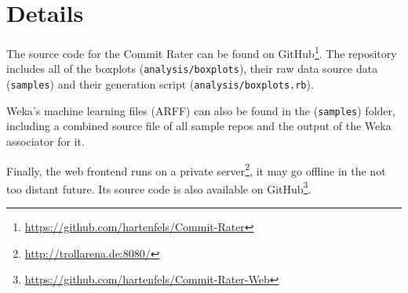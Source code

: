 \section{Details}
\label{sec:details}

The source code for the Commit Rater can be found on GitHub\footnote{\url{https://github.com/hartenfels/Commit-Rater}}. The repository includes all of the boxplots (\texttt{analysis/boxplots}), their raw data source data (\texttt{samples}) and their generation script (\texttt{analysis/boxplots.rb}).

Weka's machine learning files (ARFF) can also be found in the (\texttt{samples}) folder, including a combined source file of all sample repos and the output of the Weka associator for it.

Finally, the web frontend runs on a private server\footnote{\url{http://trollarena.de:8080/}}, it may go offline in the not too distant future. Its source code is also available on GitHub\footnote{\url{https://github.com/hartenfels/Commit-Rater-Web}}.

